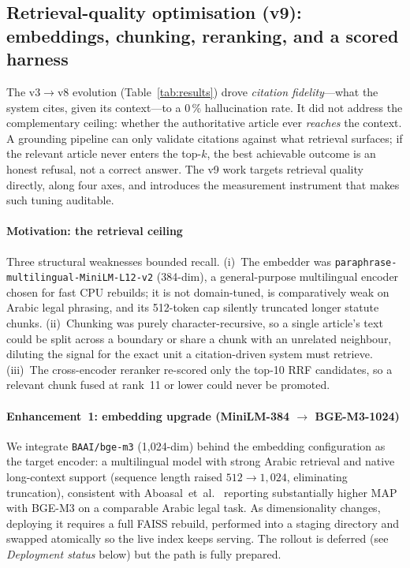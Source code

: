 \documentclass[final,1p,times]{elsarticle}
\begin{document}
\subsection{Retrieval-quality optimisation (v9): embeddings, chunking,
reranking, and a scored harness}\label{sec:retropt}

The v3$\to$v8 evolution (Table~\ref{tab:results}) drove \emph{citation
fidelity}---what the system cites, given its context---to a 0\,\% hallucination
rate. It did not address the complementary ceiling: whether the authoritative
article ever \emph{reaches} the context. A grounding pipeline can only validate
citations against what retrieval surfaces; if the relevant article never enters
the top-$k$, the best achievable outcome is an honest refusal, not a correct
answer. The v9 work targets retrieval quality directly, along four axes, and
introduces the measurement instrument that makes such tuning auditable.

\paragraph{Motivation: the retrieval ceiling} Three structural weaknesses
bounded recall. (i)~The embedder was \texttt{paraphrase-multilingual-MiniLM-L12-v2}
(384-dim), a general-purpose multilingual encoder chosen for fast CPU rebuilds;
it is not domain-tuned, is comparatively weak on Arabic legal phrasing, and its
512-token cap silently truncated longer statute chunks. (ii)~Chunking was purely
character-recursive, so a single article's text could be split across a boundary
or share a chunk with an unrelated neighbour, diluting the signal for the exact
unit a citation-driven system must retrieve. (iii)~The cross-encoder reranker
re-scored only the top-10 RRF candidates, so a relevant chunk fused at rank~11 or
lower could never be promoted.

\paragraph{Enhancement~1: embedding upgrade (MiniLM-384 $\to$ BGE-M3-1024)} We
integrate \texttt{BAAI/bge-m3} (1{,}024-dim) behind the embedding configuration as
the target encoder: a multilingual model with strong Arabic retrieval and native
long-context support (sequence length raised $512\to1{,}024$, eliminating
truncation), consistent with Aboasal~et~al.~\cite{aboasal2025} reporting
substantially higher MAP with BGE-M3 on a comparable Arabic legal task. As
dimensionality changes, deploying it requires a full FAISS rebuild, performed into
a staging directory and swapped atomically so the live index keeps serving. The
rollout is deferred (see \emph{Deployment status} below) but the path is fully
prepared.
\end{document}
